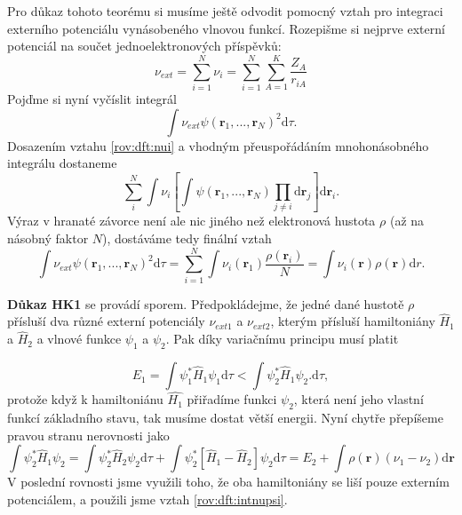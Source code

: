 \bigskip
Pro důkaz tohoto teorému si musíme ještě odvodit pomocný vztah pro integraci externího potenciálu vynásobeného vlnovou funkcí.
Rozepišme si nejprve externí potenciál na součet jednoelektronových příspěvků:
\begin{equation}
\nu_{ext}=\sum_{i=1}^N \nu_i = \sum_{i=1}^N \sum_{A=1}^K \frac{Z_A}{r_{iA}}  
\label{rov:dft:nui}
\end{equation}
Pojďme si nyní vyčíslit integrál
\begin{equation}
\int \nu_{ext} \psi(\textbf{r}_1,...,\textbf{r}_N)^2\mathrm{d}\tau .
\end{equation}
Dosazením vztahu \eqref{rov:dft:nui} a vhodným přeuspořádáním mnohonásobného integrálu dostaneme
\begin{equation}
\sum_i^N \int \nu_i \left[\int \psi(\mathbf{r}_1,...,\mathbf{r}_N)\prod_{j\neq i}\mathrm{d}\textbf{r}_j\right] \mathrm{d}\textbf{r}_i .
\end{equation}
Výraz v hranaté závorce není ale nic jiného než elektronová hustota $\rho$ (až na násobný faktor $N$), dostáváme tedy finální vztah
\begin{equation}
\int \nu_{ext} \psi(\textbf{r}_1,...,\textbf{r}_N)^2\mathrm{d}\tau = \sum_{i=1}^N \int \nu_i(\textbf{r}_1)\frac{\rho(\textbf{r}_i)}{N}= \int \nu_i(\textbf{r})\rho(\textbf{r}) \mathrm{d}r .
\label{rov:dft:intnupsi}
\end{equation}

\bigskip 
\textbf{Důkaz HK1} se provádí sporem. Předpokládejme, že jedné dané hustotě $\rho$ přísluší dva různé externí potenciály $\nu_{ext1}$ a $\nu_{ext2}$, kterým přísluší hamiltoniány $\hat{H}_1$ a $\hat{H}_2$ a vlnové funkce $\psi_1$ a $\psi_2$.  Pak díky variačnímu principu musí platit

\begin{equation}
E_1 = \int \psi_1^* \hat{H}_1 \psi_1 \mathrm{d}\tau < \int \psi_2^* \hat{H}_1 \psi_2 . \mathrm{d}\tau ,
\end{equation}
protože když k hamiltoniánu $\hat{H_1}$ přiřadíme funkci $\psi_2$, která není jeho vlastní funkcí základního stavu, tak musíme dostat větší energii. Nyní chytře přepíšeme pravou stranu nerovnosti jako  
\begin{equation}
\int \psi_2^* \hat{H}_1 \psi_2 = \int \psi_2^* \hat{H}_2 \psi_2\mathrm{d}\tau  + \int \psi_2^* \left[\hat{H}_1-\hat{H}_2\right] \psi_2\mathrm{d}\tau = E_2 + \int \rho(\mathbf{r})(\nu_1-\nu_2)\mathrm{d}\mathbf{r}  
\end{equation}
V poslední rovnosti jsme využili toho, že oba hamiltoniány se liší pouze externím potenciálem, a použili jsme vztah \eqref{rov:dft:intnupsi}.


